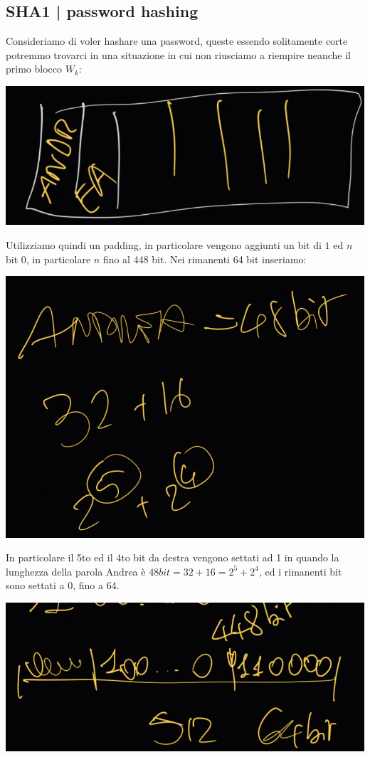 \documentclass[11pt, oneside]{article}   	%
\begin{document}
\subsection*{SHA1 | password hashing}
Consideriamo di voler hashare una password, queste essendo solitamente corte potremmo trovarci in una situazione in cui non riusciamo a riempire neanche il primo blocco $W_k$:
\begin{center}
\includegraphics[scale= 0.5]{blocks5}
\end{center}
Utilizziamo quindi un padding, in particolare vengono aggiunti un bit di $1$ ed $n$ bit $0$, in particolare $n$ fino al 448 bit. Nei rimanenti 64 bit inseriamo:
\begin{center}
\includegraphics[scale= 0.3]{blocks6}
\end{center}
In particolare il 5to ed il 4to bit da destra vengono settati ad 1 in quando la lunghezza della parola Andrea è $48 bit = 32 + 16 = 2^5 + 2^4$, ed i rimanenti bit sono settati a 0, fino a 64.
\begin{center}
\includegraphics[scale= 0.3]{blocks7}
\end{center}
\end{document}
